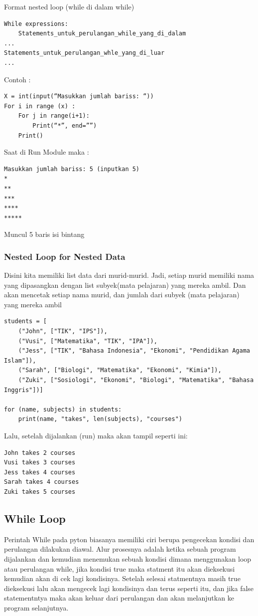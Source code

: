Format nested loop (while di dalam while)
\begin{verbatim}
While expressions:
	Statements_untuk_perulangan_while_yang_di_dalam
...
Statements_untuk_perulangan_whle_yang_di_luar
...
\end{verbatim}

Contoh :
\begin{verbatim}
X = int(input(“Masukkan jumlah bariss: “))
For i in range (x) :
	For j in range(i+1):
		Print(“*”, end=””)
	Print()
\end{verbatim}
Saat di Run Module maka :
\begin{verbatim}
Masukkan jumlah bariss: 5 (inputkan 5)
*
**
***
****
***** 
\end{verbatim}
Muncul 5 baris isi bintang

\subsubsection{Nested Loop for Nested Data}
Disini kita memiliki list data dari murid-murid. Jadi, setiap murid memiliki nama yang dipasangkan dengan list subyek(mata pelajaran) yang mereka ambil. Dan akan mencetak setiap nama murid, dan jumlah dari subyek (mata pelajaran) yang mereka ambil
\begin{lstlisting}
students = [
    ("John", ["TIK", "IPS"]),
    ("Vusi", ["Matematika", "TIK", "IPA"]),
    ("Jess", ["TIK", "Bahasa Indonesia", "Ekonomi", "Pendidikan Agama Islam"]),
    ("Sarah", ["Biologi", "Matematika", "Ekonomi", "Kimia"]),
    ("Zuki", ["Sosiologi", "Ekonomi", "Biologi", "Matematika", "Bahasa Inggris"])]

for (name, subjects) in students:
    print(name, "takes", len(subjects), "courses")
\end{lstlisting}
Lalu, setelah dijalankan (run) maka akan tampil seperti ini:
\begin{verbatim}
John takes 2 courses
Vusi takes 3 courses
Jess takes 4 courses
Sarah takes 4 courses
Zuki takes 5 courses
\end{verbatim}

\subsection{While Loop}
Perintah While pada pyton biasanya memiliki ciri berupa pengecekan kondisi dan perulangan dilakukan diawal\cite{santoso2009bahasa}. Alur prosesnya adalah ketika sebuah program dijalankan dan kemudian menemukan sebuah kondisi dimana menggunakan loop atau perulangan while, jika kondisi true maka statment itu akan dieksekusi kemudian akan di cek lagi kondisinya. Setelah selesai statmentnya masih true dieksekusi lalu akan mengecek lagi kondisinya dan terus seperti itu, dan jika false statementntya maka akan keluar dari perulangan dan akan melanjutkan ke program selanjutnya.

